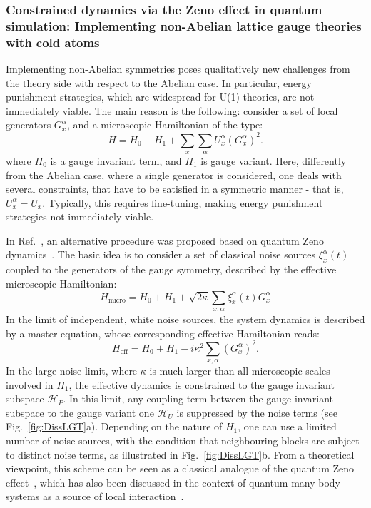 \documentclass[epj,final]{svjour}
\begin{document}
\subsubsection{Constrained dynamics via the Zeno effect in quantum simulation: Implementing non-Abelian lattice gauge theories with cold atoms\cite{stannigel2014constrained}}

Implementing non-Abelian symmetries poses qualitatively new challenges from the theory side with respect to the Abelian case. In particular, energy punishment strategies, which are widespread for U(1) theories, are not immediately viable. The main reason is the following: consider a set of local generators $G^\alpha_x$, and a microscopic Hamiltonian of the type:
\begin{equation}
H = H_0+H_1+ \sum_x\sum_\alpha U_x^\alpha (G_x^\alpha)^2.
\end{equation}
where $H_0$ is a gauge invariant term, and $H_1$ is gauge variant. Here, differently from the Abelian case, where a single generator is considered, one deals with several constraints, that have to be satisfied in a symmetric manner - that is, $U^\alpha_x=U_x$. Typically, this requires fine-tuning, making energy punishment strategies not immediately viable. 

In Ref.~\cite{stannigel2014constrained}, an alternative procedure was proposed based on quantum Zeno dynamics~\cite{Facchi:2008aa}. The basic idea is to consider a set of classical noise sources $\xi_x^\alpha(t)$ coupled to the generators of the gauge symmetry, described by the effective microscopic Hamiltonian:
\begin{equation}
H_{\mathrm{micro}} =  H_0+H_1+\sqrt{2\kappa}\sum_{x,\alpha}\xi_x^\alpha(t)G^\alpha_x
\end{equation}
In the limit of independent, white noise sources, the system dynamics is described by a master equation, whose corresponding effective Hamiltonian reads:
\begin{equation}
H_{\mathrm{eff}} =  H_0+H_1-i\kappa^2\sum_{x,\alpha}(G^\alpha_x)^2.
\end{equation}
In the large noise limit, where $\kappa$ is much larger than all microscopic scales involved in $H_1$, the effective dynamics is constrained to the gauge invariant subspace $\mathcal{H}_P$. In this limit, any coupling term between the gauge invariant subspace to the gauge variant one $\mathcal{H}_U$ is suppressed by the noise terms (see Fig.~\ref{fig:DissLGT}a). Depending on the nature of $H_1$, one can use a limited number of noise sources, with the condition that neighbouring blocks are subject to distinct noise terms, as illustrated in  Fig.~\ref{fig:DissLGT}b. From a theoretical viewpoint, this scheme can be seen as a classical analogue of the quantum Zeno effect~\cite{Facchi:2008aa}, which has also been discussed in the context of quantum many-body systems as a source of local interaction~\cite{Syassen:2008aa,Roncaglia:2010aa,Kantian:2009aa}.
\end{document}
